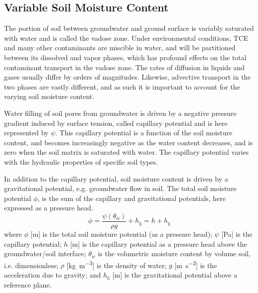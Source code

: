 \begin{comment}

To cover:

- Description of the physics that cause the variable soil moisture
- Modeling this
  - Correy & Brooks
  - van Genuchten

- Description of van Genuchten


\end{comment}

\subsection{Variable Soil Moisture Content}\label{sec:van_genuchten}

The portion of soil between groundwater and ground surface is variably saturated with water and is called the vadose zone.
Under environmental conditions, TCE and many other contaminants are miscible in water, and will be partitioned between its dissolved and vapor phases, which has profound effects on the total contaminant transport in the vadose zone.
The rates of diffusion in liquids and gases usually differ by orders of magnitudes. %
Likewise, advective transport in the two phases are vastly different, and as such it is important to account for the varying soil moisture content.\par %

Water filling of soil pores from groundwater is driven by a negative pressure gradient induced by surface tension, called capillary potential and is here represented by $\psi$.
This capillary potential is a function of the soil moisture content, and becomes increasingly negative as the water content decreases, and is zero when the soil matrix is saturated with water.
The capillary potential varies with the hydraulic properties of specific soil types.\par

In addition to the capillary potential, soil moisture content is driven by a gravitational potential, e.g. groundwater flow in soil.
The total soil moisture potential $\phi$, is the sum of the capillary and gravitational potentials, here expressed as a pressure head.
\begin{equation}
  \phi = \frac{\psi(\theta_w)}{\rho g} + h_\mathrm{g} = h + h_\mathrm{g}
\end{equation}
where $\phi$ [\si{\metre}] is the total soil moisture potential (as a pressure head);
$\psi$ [\si{\pascal}] is the capillary potential;
$h$ [\si{\metre}] is the capillary potential as a pressure head above the groundwater/soil interface;
$\theta_w$ is the volumetric moisture content by volume soil, i.e. dimensionless;
$\rho$ [\si{\kilo\gram\per\metre\cubed}] is the density of water;
$g$ [\si{\metre\per\second\squared}] is the acceleration due to gravity;
and $h_\mathrm{g}$ [\si{\metre}] is the gravitational potential above a reference plane.\par

